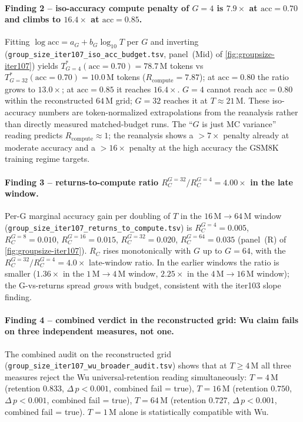 \paragraph{Finding 2 -- iso-accuracy compute penalty of $G{=}4$ is
$7.9\times$ at $\mathrm{acc}{=}0.70$ and climbs to $16.4\times$ at
$\mathrm{acc}{=}0.85$.}
Fitting $\log \mathrm{acc} = a_G + b_G \log_{10} T$ per $G$ and
inverting (\texttt{group\_size\_iter107\_iso\_acc\_budget.tsv},
panel~(Mid) of \autoref{fig:groupsize-iter107}) yields
$T^*_{G=4}(\mathrm{acc}=0.70) = 78.7\,$M tokens vs
$T^*_{G=32}(\mathrm{acc}=0.70) = 10.0\,$M tokens
($R_{\mathrm{compute}} = 7.87$); at $\mathrm{acc}{=}0.80$ the ratio
grows to $13.0\times$; at $\mathrm{acc}{=}0.85$ it reaches
$16.4\times$.  $G{=}4$ cannot reach $\mathrm{acc}{=}0.80$ within
the reconstructed $64\,$M grid; $G{=}32$ reaches it at $T{\approx}21\,$M.
These iso-accuracy numbers are token-normalized extrapolations from the
reanalysis rather than directly measured matched-budget runs.
The ``$G$ is just MC variance'' reading predicts
$R_{\mathrm{compute}} \approx 1$; the reanalysis shows a $>7\times$ penalty
already at moderate accuracy and a $>16\times$ penalty at the high
accuracy the GSM8K training regime targets.

\paragraph{Finding 3 -- returns-to-compute ratio $R_C^{G=32}/R_C^{G=4}
= 4.00\times$ in the late window.}
Per-G marginal accuracy gain per doubling of $T$ in the
$16\,\mathrm{M} \to 64\,\mathrm{M}$ window
(\texttt{group\_size\_iter107\_returns\_to\_compute.tsv}) is
$R_C^{G=4} = 0.005$, $R_C^{G=8} = 0.010$, $R_C^{G=16} = 0.015$,
$R_C^{G=32} = 0.020$, $R_C^{G=64} = 0.035$
(panel~(R) of \autoref{fig:groupsize-iter107}).  $R_C$ rises
monotonically with $G$ up to $G{=}64$, with the
$R_C^{G=32}/R_C^{G=4} = 4.0\times$ late-window ratio.  In the
earlier windows the ratio is smaller ($1.36\times$ in the
$1\,\mathrm{M}\to 4\,\mathrm{M}$ window, $2.25\times$ in the
$4\,\mathrm{M}\to 16\,\mathrm{M}$ window); the G-vs-returns spread
\emph{grows} with budget, consistent with the iter103 slope finding.

\paragraph{Finding 4 -- combined verdict in the reconstructed grid: Wu claim fails on three
independent measures, not one.}
The combined audit on the reconstructed grid
(\texttt{group\_size\_iter107\_wu\_broader\_audit.tsv})
shows that at $T\ge 4\,$M all three measures reject the Wu
universal-retention reading simultaneously:
$T{=}4\,$M (retention $0.833$, $\Delta\,p<0.001$, combined fail = true),
$T{=}16\,$M (retention $0.750$, $\Delta\,p<0.001$, combined fail = true),
$T{=}64\,$M (retention $0.727$, $\Delta\,p<0.001$, combined fail = true).
$T{=}1\,$M alone is statistically compatible with Wu.

